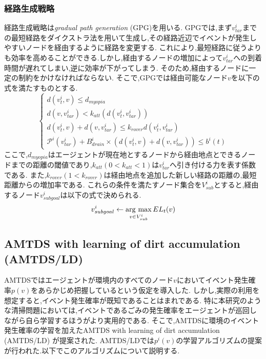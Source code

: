\documentclass[12pt,a4j,twoside]{jarticle}
\newcommand{\argmax}{\mathop{\rm arg~max}\limits}
\begin{document}
\subsubsection{経路生成戦略}
  \label{route_strategy}
  経路生成戦略は{\em gradual path generation} (GPG)を用いる.
  GPGでは,まず$v^i_{tar}$までの最短経路をダイクストラ法を用いて生成し,その経路近辺でイベントが発生しやすいノードを経由するように経路を変更する.
  これにより,最短経路に従うよりも効率を高めることができる.しかし,経由するノードの増加によって$v^i_{tar}$への到着時間が遅れてしまい,逆に効率が下がってしまう.
  そのため,経由するノードに一定の制約をかけなければならない.
  そこで,GPGでは経由可能なノード$v$を以下の式を満たすものとする.
  \begin{equation}
    \begin{cases}
      d(v^i_t, v) \leq d_{myopia} \\
      d(v, v^i_{tar}) < k_{att}(d(v^i_t, v^i_{tar})) \\
      d(v^i_t, v) + d(v, v^i_{tar}) \leq k_{rover}d(v^i_t, v^i_{tar}) \\
      \mathcal{P}^i(v^i_{tar}) + B^i_{drain} \times (d(v^i_t, v) + d(v, v^i_{tar})) \leq b^i(t)
    \end{cases}
  \end{equation}
  ここで,$d_{myopia}$はエージェントが現在地とするノードから経由地点とできるノードまでの距離の閾値であり,$k_{att} (0 < k_{att} < 1)$は$v^i_{tar}$へ引き付ける力を表す係数である.
  また,$k_{rover} (1 < k_{rover})$は経由地点を追加した新しい経路の距離の,最短距離からの増加率である.
  これらの条件を満たすノード集合を$V^i_{sub}$とすると,経由するノード$v^i_{subgoal}$は以下の式で決められる.
  \begin{equation}
    v^i_{subgoal} \gets \argmax_{v \in V^i_{sub}} EL_t(v)
  \end{equation}

  \subsection{AMTDS with learning of dirt accumulation (AMTDS/LD)}
  AMTDSではエージェントが環境内のすべてのノード$v$においてイベント発生確率$p(v)$をあらかじめ把握しているという仮定を導入した.
  しかし,実際の利用を想定すると,イベント発生確率が既知であることはまれである.
  特に本研究のような清掃問題においては,イベントであるごみの発生確率をエージェントが巡回しながら自ら学習するほうがより実用的である.
  そこで,AMTDSに環境のイベント発生確率の学習を加えたAMTDS with learning of dirt accumulation (AMTDS/LD) \cite{sugiyama2015}が提案された.
  AMTDS/LDでは$p^i(v)$の学習アルゴリズムの提案が行われた.以下でこのアルゴリズムについて説明する.
  
\end{document}
